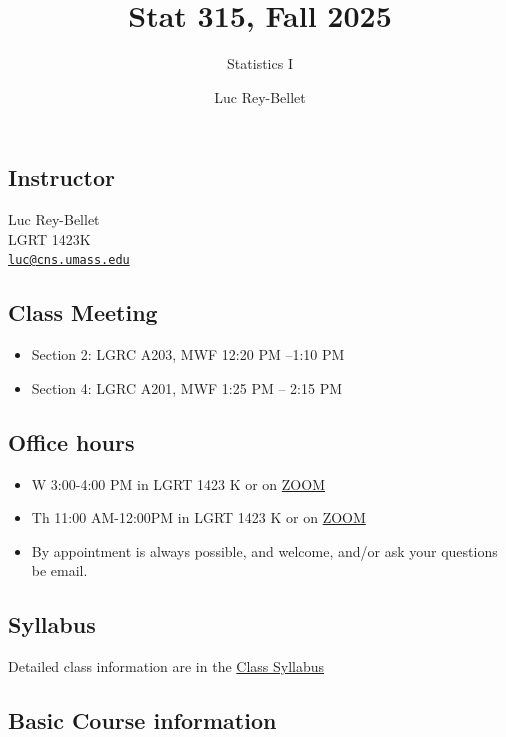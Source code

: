 \documentclass[
  letterpaper,
  DIV=11,
  numbers=noendperiod]{scrartcl}
\title{Stat 315, Fall 2025}
\subtitle{Statistics I}
\author{Luc Rey-Bellet}
\date{}
\providecommand{\tightlist}{%
  \setlength{\itemsep}{0pt}\setlength{\parskip}{0pt}}
\begin{document}
\maketitle


\subsection{Instructor}\label{instructor}

Luc Rey-Bellet\\
LGRT 1423K\\
\href{mailto:luc@cns.umass.edu}{\nolinkurl{luc@cns.umass.edu}}

\subsection{Class Meeting}\label{class-meeting}

\begin{itemize}
\item
  Section 2: LGRC A203, MWF 12:20 PM --1:10 PM
\item
  Section 4: LGRC A201, MWF 1:25 PM -- 2:15 PM
\end{itemize}

\subsection{Office hours}\label{office-hours}

\begin{itemize}
\tightlist
\item
  W 3:00-4:00 PM in LGRT 1423 K or on
  \href{https://umass-amherst.zoom.us/my/luc.reybellet.office.hours}{ZOOM}
\item
  Th 11:00 AM-12:00PM in LGRT 1423 K or on
  \href{https://umass-amherst.zoom.us/my/luc.reybellet.office.hours}{ZOOM}
\item
  By appointment is always possible, and welcome, and/or ask your
  questions be email.
\end{itemize}

\subsection{Syllabus}\label{syllabus}

Detailed class information are in the
\href{https://umamherst.instructure.com/courses/31946/assignments/syllabus}{Class
Syllabus}

\subsection{Basic Course information}\label{basic-course-information}
\end{document}
